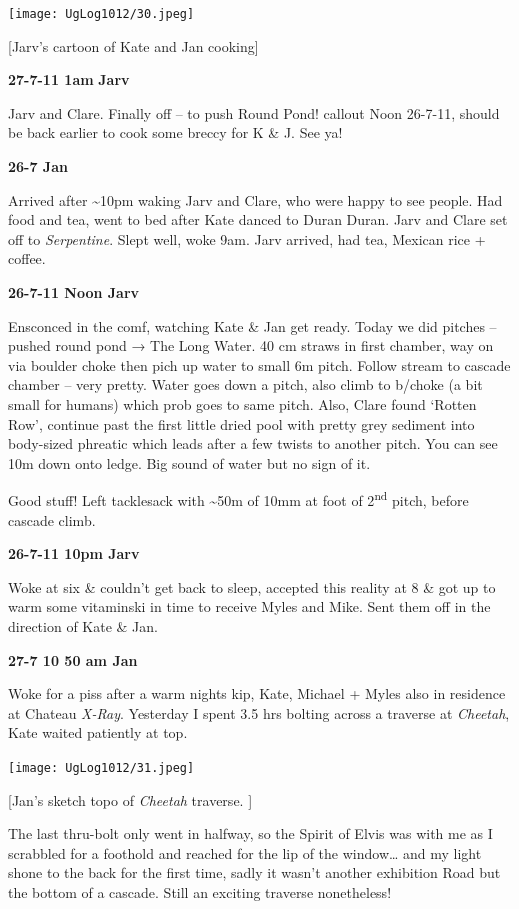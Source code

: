 \texttt{[image: UgLog1012/30.jpeg]}

{[}Jarv's cartoon of Kate and Jan cooking{]}

\textbf{27-7-11 1am} \textbf{Jarv}

Jarv and Clare. Finally off -- to push Round Pond! callout Noon 26-7-11,
should be back earlier to cook some breccy for K \& J. See ya!

\textbf{26-7 Jan}

Arrived after \textasciitilde{}10pm waking Jarv and Clare, who were
happy to see people. Had food and tea, went to bed after Kate danced to
Duran Duran. Jarv and Clare set off to \emph{Serpentine}. Slept well,
woke 9am. Jarv arrived, had tea, Mexican rice + coffee.

\textbf{26-7-11 Noon Jarv}

Ensconced in the comf, watching Kate \& Jan get ready. Today we did
pitches -- pushed round pond → The Long Water. 40 cm straws in first
chamber, way on via boulder choke then pich up water to small 6m pitch.
Follow stream to cascade chamber -- very pretty. Water goes down a
pitch, also climb to b/choke (a bit small for humans) which prob goes to
same pitch. Also, Clare found `Rotten Row', continue past the first
little dried pool with pretty grey sediment into body-sized phreatic
which leads after a few twists to another pitch. You can see 10m down
onto ledge. Big sound of water but no sign of it.

Good stuff! Left tacklesack with \textasciitilde{}50m of 10mm at foot of
2\textsuperscript{nd} pitch, before cascade climb.

\textbf{26-7-11 10pm Jarv}

Woke at six \& couldn't get back to sleep, accepted this reality at 8 \&
got up to warm some vitaminski in time to receive Myles and Mike. Sent
them off in the direction of Kate \& Jan.

\textbf{27-7 10 50 am Jan}

Woke for a piss after a warm nights kip, Kate, Michael + Myles also in
residence at Chateau \emph{X-Ray}. Yesterday I spent 3.5 hrs bolting
across a traverse at \emph{Cheetah}, Kate waited patiently at top.

\texttt{[image: UgLog1012/31.jpeg]}

{[}Jan's sketch topo of \emph{Cheetah} traverse. {]}

The last thru-bolt only went in halfway, so the Spirit of Elvis was with
me as I scrabbled for a foothold and reached for the lip of the
window\ldots{} and my light shone to the back for the first time, sadly
it wasn't another exhibition Road but the bottom of a cascade. Still an
exciting traverse nonetheless!

